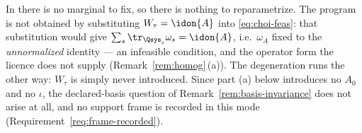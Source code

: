 
In  there is no marginal to fix, so there is
nothing to reparametrize. The program is not obtained by substituting
$W_{\tau}=\idon{A}$ into \eqref{eq:choi-feas}: that substitution would give
$\sum_s\tr_{\Qsys_s}\omega_s=\idon{A}$, i.e.\ $\omega_A$ fixed to the
\emph{unnormalized} identity --- an infeasible condition, and the operator
form the licence does not supply (Remark~\ref{rem:homog}\,(a)). The
degeneration runs the other way: $W_{\tau}$ is simply never introduced.
Since part (a) below introduces no $A_0$ and no $\iota$, the declared-basis
question of Remark~\ref{rem:basis-invariance} does not arise at all, and no
support frame is recorded in this mode
(Requirement~\ref{req:frame-recorded}).

